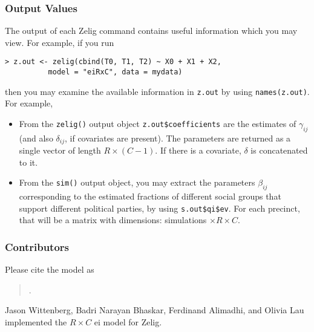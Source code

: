 \subsubsection{Output Values}

The output of each Zelig command contains useful information which you may
view. For example, if you run
\begin{verbatim}
> z.out <- zelig(cbind(T0, T1, T2) ~ X0 + X1 + X2, 
          model = "eiRxC", data = mydata)
\end{verbatim}

\noindent then you may examine the available information in
\texttt{z.out} by using \texttt{names(z.out)}.  For example,

\begin{itemize}
\item From the \texttt{zelig()} output object
  \texttt{z.out\$coefficients} are the estimates of $\gamma_{ij}$ (and
  also $\delta_{ij}$, if covariates are present). The parameters are
  returned as a single vector of length $R\times (C-1)$. If there is a
  covariate, $\delta$ is concatenated to it.

\item From the \texttt{sim()} output object, you may extract the
  parameters $\beta_{ij}$ corresponding to the estimated fractions of
  different social groups that support different political parties, by
  using \texttt{s.out\$qi\$ev}.  For each precinct, that will be a
  matrix with dimensions: simulations $\times R \times C$.
\end{itemize}

\subsubsection{Contributors}

Please cite the model as 
\begin{verse}
.
\end{verse}

Jason Wittenberg, Badri Narayan Bhaskar, Ferdinand Alimadhi, and
Olivia Lau implemented the $R \times C$ {\sc ei} model for Zelig.

